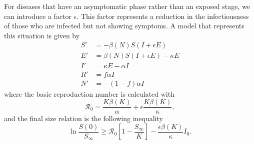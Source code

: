 For diseases that have an asymptomatic phase rather than an exposed stage, we can introduce a factor $\epsilon$.
This factor represents a reduction in the infectiousness of those who are infected but not showing symptoms.
A model that represents this situation is given by
\begin{align*}
    S' &= - \beta(N)S(I + \epsilon E) \\
    E' &= \beta(N)S(I + \epsilon E) - \kappa E \\
    I' &= \kappa E - \alpha I \\
    R' &= f \alpha I \\
    N' &= - (1 - f) \alpha I
\end{align*}
where the basic reproduction number is calculated with
\begin{equation*}
    \mathcal{R}_0 = \frac{K\beta(K)}{\alpha} + \epsilon\frac{K\beta(K)}{\kappa},
\end{equation*}
and the final size relation is the following inequality
\begin{equation*}
    \ln\frac{S(0)}{S_\infty} \geq \mathcal{R}_0 \left[ 1 - \frac{S_\infty}{K} \right] - \frac{\epsilon\beta(K)}{\kappa}I_0.
\end{equation*}